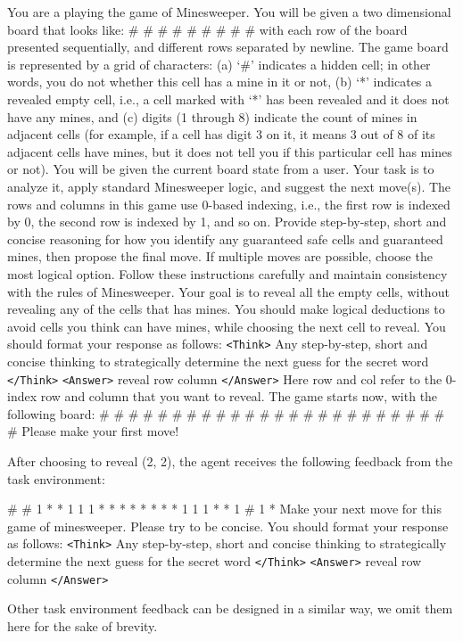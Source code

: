 \documentclass{article}
\theoremstyle{plain}
\theoremstyle{definition}
\theoremstyle{remark}
\begin{document}
\begin{tcolorbox}[colback=gray!20, colframe=black, title=Minesweeper Agent Prompt]
You are a playing the game of Minesweeper. You will be given a two dimensional board that looks like:
\# \# \#
\# \# \#
\# \# \#
with each row of the board presented sequentially, and different rows separated by newline. The game board is represented by a grid of characters:
(a) `\#' indicates a hidden cell; in other words, you do not whether this cell has a mine in it or not,
(b) `*' indicates a revealed empty cell, i.e., a cell marked with `*' has been revealed and it does not have any mines, and
(c) digits (1 through 8) indicate the count of mines in adjacent cells (for example, if a cell has digit 3 on it, it means 3 out of 8 of its adjacent cells have mines, but it does not tell you if this particular cell has mines or not).
You will be given the current board state from a user. Your task is to analyze it, apply standard Minesweeper logic, and suggest the next move(s).
The rows and columns in this game use 0-based indexing, i.e., the first row is indexed by 0, the second row is indexed by 1, and so on.
Provide step-by-step, short and concise reasoning for how you identify any guaranteed safe cells and guaranteed mines, then propose the final move.
If multiple moves are possible, choose the most logical option.
Follow these instructions carefully and maintain consistency with the rules of Minesweeper. Your goal is to reveal all the empty cells, without revealing any of the cells that has mines. You should make logical deductions to avoid cells you think can have mines, while choosing the next cell to reveal.
You should format your response as follows:
\texttt{<Think>} Any step-by-step, short and concise thinking to strategically determine the next guess for the secret word \texttt{</Think>}
\texttt{<Answer>} reveal row column \texttt{</Answer>}
Here row and col refer to the 0-index row and column that you want to reveal.
The game starts now, with the following board:
\# \# \# \# \#
\# \# \# \# \#
\# \# \# \# \#
\# \# \# \# \#
\# \# \# \# \#
Please make your first move!
\end{tcolorbox}
After choosing to reveal (2, 2), the agent receives the following feedback from the task environment:
\begin{tcolorbox}[colback=gray!20, colframe=black, title=Minesweeper Environment Feedback Example]
\# \# 1 * *
1 1 1 * *
* * * * *
* 1 1 1 *
* 1 \# 1 *
Make your next move for this game of minesweeper. Please try to be concise. You should format your response as follows: \texttt{<Think>} Any step-by-step, short and concise thinking to strategically determine the next guess for the secret word \texttt{</Think>}
\texttt{<Answer>} reveal row column \texttt{</Answer>}
\end{tcolorbox}
Other task environment feedback can be designed in a similar way, we omit them here for the sake of brevity.
\newpage
\end{document}
